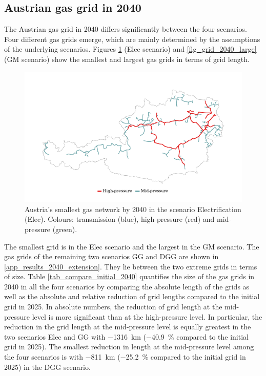 \subsection{Austrian gas grid in 2040}\label{res_grid2040}
The Austrian gas grid in 2040 differs significantly between the four scenarios. Four different gas grids emerge, which are mainly determined by the assumptions of the underlying scenarios. Figures \ref{fig_grid_2040_small} (Elec scenario) and \ref{fig_grid_2040_large} (GM scenario) show the smallest and largest gas grids in terms of grid length. 

\begin{figure}[h]
	\centering
	\includegraphics[width=1\linewidth]{figures/results/gas_grid_2040_elec.pdf}
	\caption{Austria's smallest gas network by 2040 in the scenario Electrification (Elec). Colours: transmission (blue), high-pressure (red) and mid-pressure (green).}
	\label{fig_grid_2040_small}
\end{figure}

The smallest grid is in the Elec scenario and the largest in the GM scenario. The gas grids of the remaining two scenarios GG and DGG are shown in \ref{app_results_2040_extension}. They lie between the two extreme grids in terms of size. Table \ref{tab_compare_initial_2040} quantifies the size of the gas grids in 2040 in all the four scenarios by comparing the absolute length of the grids as well as the absolute and relative reduction of grid lengths compared to the initial grid in 2025.  In absolute numbers, the reduction of grid length at the mid-pressure level is more significant than at the high-pressure level. In particular, the reduction in the grid length at the mid-pressure level is equally greatest in the two scenarios Elec and GG with \SI{-1316}{km} (\SI{-40.9}{\%} compared to the initial grid in 2025). The smallest reduction in length at the mid-pressure level among the four scenarios is with \SI{-811}{km} (\SI{-25.2}{\%} compared to the initial grid in 2025) in the DGG scenario. 

